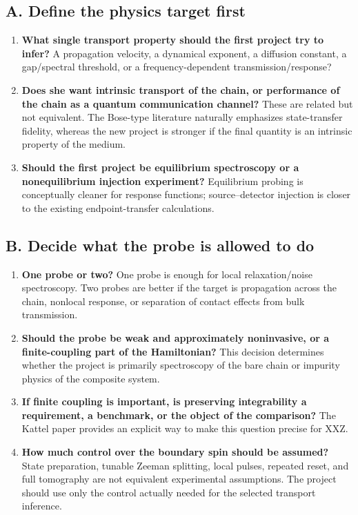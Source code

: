 \documentclass[11pt,a4paper]{article}
\begin{document}
\subsection*{A. Define the physics target first}
\begin{enumerate}[label=\textbf{Q\arabic*.},leftmargin=1.2cm]
    \item \textbf{What single transport property should the first project try to infer?}  A propagation velocity, a dynamical exponent, a diffusion constant, a gap/spectral threshold, or a frequency-dependent transmission/response?
    \item \textbf{Does she want intrinsic transport of the chain, or performance of the chain as a quantum communication channel?}  These are related but not equivalent.  The Bose-type literature naturally emphasizes state-transfer fidelity, whereas the new project is stronger if the final quantity is an intrinsic property of the medium.
    \item \textbf{Should the first project be equilibrium spectroscopy or a nonequilibrium injection experiment?}  Equilibrium probing is conceptually cleaner for response functions; source--detector injection is closer to the existing endpoint-transfer calculations.
\end{enumerate}

\subsection*{B. Decide what the probe is allowed to do}
\begin{enumerate}[label=\textbf{Q\arabic*.},resume,leftmargin=1.2cm]
    \item \textbf{One probe or two?}  One probe is enough for local relaxation/noise spectroscopy.  Two probes are better if the target is propagation across the chain, nonlocal response, or separation of contact effects from bulk transmission.
    \item \textbf{Should the probe be weak and approximately noninvasive, or a finite-coupling part of the Hamiltonian?}  This decision determines whether the project is primarily spectroscopy of the bare chain or impurity physics of the composite system.
    \item \textbf{If finite coupling is important, is preserving integrability a requirement, a benchmark, or the object of the comparison?}  The Kattel paper provides an explicit way to make this question precise for XXZ.
    \item \textbf{How much control over the boundary spin should be assumed?}  State preparation, tunable Zeeman splitting, local pulses, repeated reset, and full tomography are not equivalent experimental assumptions.  The project should use only the control actually needed for the selected transport inference.
\end{enumerate}
\end{document}
